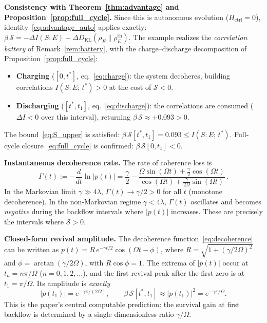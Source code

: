 \documentclass[12pt]{article}
\begin{document}
\textbf{Consistency with
Theorem~\ref{thm:advantage} and
Proposition~\ref{prop:full_cycle}.}
Since this is autonomous evolution ($H_{\mathrm{ctrl}} = 0$),
identity~\eqref{eq:advantage_auto} applies exactly:
$\beta\,\mathcal{S} = -\Delta I(S{:}E)
- \Delta D_{\mathrm{KL}}(\rho_E \| \rho_E^{\mathrm{th}})$.
The example realizes the \emph{correlation battery}
of Remark~\ref{rem:battery}, with the charge--discharge
decomposition of
Proposition~\ref{prop:full_cycle}:
\begin{itemize}
\item \textbf{Charging} ($[0, t^*]$, eq.~\eqref{eq:charge}):
  the system decoheres, building correlations
  $I(S{:}E;\, t^*) > 0$ at the cost of
  $\mathcal{S} < 0$.
\item \textbf{Discharging} ($[t^*, t_1]$,
  eq.~\eqref{eq:discharge}):
  the correlations are consumed
  ($\Delta I < 0$ over this interval),
  returning $\beta\,\mathcal{S} \approx +0.093 > 0$.
\end{itemize}
The bound~\eqref{eq:S_upper} is satisfied:
$\beta\,\mathcal{S}[t^*, t_1] = 0.093
\leq I(S{:}E;\, t^*)$.
Full-cycle closure~\eqref{eq:full_cycle} is confirmed:
$\beta\,\mathcal{S}[0, t_1] < 0$.

\textbf{Instantaneous decoherence rate.}
The rate of coherence loss is
\begin{equation}
\label{eq:Gamma_inst}
\Gamma(t) := -\frac{d}{dt}\ln|p(t)|
= \frac{\gamma}{2}
  - \frac{\Omega\sin(\Omega t)
    + \tfrac{\gamma}{2}\cos(\Omega t)}
  {\cos(\Omega t)
    + \tfrac{\gamma}{2\Omega}\sin(\Omega t)}\,.
\end{equation}
In the Markovian limit $\gamma \gg 4\lambda$,
$\Gamma(t) \to \gamma/2 > 0$ for all $t$
(monotone decoherence).
In the non-Markovian regime $\gamma < 4\lambda$,
$\Gamma(t)$ oscillates and becomes \emph{negative}
during the backflow intervals where $|p(t)|$ increases.
These are precisely the intervals where
$\mathcal{S} > 0$.

\textbf{Closed-form revival amplitude.}
The decoherence function~\eqref{eq:decoherence} can be
written as $p(t) = R\, e^{-\gamma t/2}\cos(\Omega t - \phi)$,
where $R = \sqrt{1 + (\gamma/2\Omega)^2}$ and
$\phi = \arctan(\gamma/2\Omega)$, with $R\cos\phi = 1$.
The extrema of $|p(t)|$ occur at $t_n = n\pi/\Omega$
($n = 0, 1, 2, \ldots$), and the first revival peak
after the first zero is at $t_1 = \pi/\Omega$.
Its amplitude is \emph{exactly}
\begin{equation}
\label{eq:revival_exact}
|p(t_1)| = e^{-\gamma\pi/(2\Omega)},
\qquad
\beta\,\mathcal{S}[t^*, t_1]
\approx |p(t_1)|^2
= e^{-\gamma\pi/\Omega}.
\end{equation}
This is the paper's central computable prediction: the
survival gain at first backflow is determined by a single
dimensionless ratio $\gamma/\Omega$.
\end{document}
